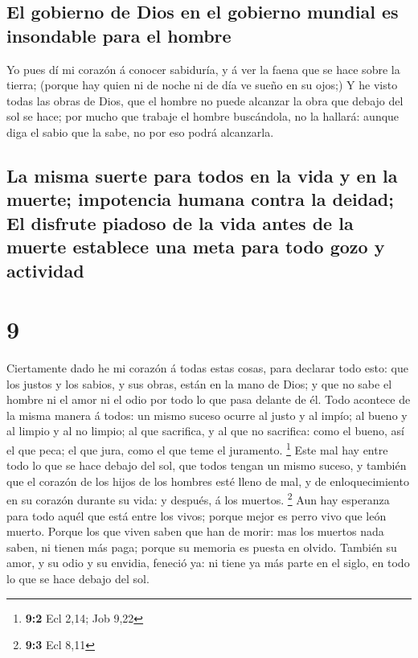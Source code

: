 \hypertarget{el-gobierno-de-dios-en-el-gobierno-mundial-es-insondable-para-el-hombre}{%
\subsection{El gobierno de Dios en el gobierno mundial es insondable
para el
hombre}\label{el-gobierno-de-dios-en-el-gobierno-mundial-es-insondable-para-el-hombre}}

 Yo pues dí mi corazón á conocer sabiduría, y á ver la
faena que se hace sobre la tierra; (porque hay quien ni de noche ni de
día ve sueño en su ojos;)  Y he visto todas las obras de
Dios, que el hombre no puede alcanzar la obra que debajo del sol se
hace; por mucho que trabaje el hombre buscándola, no la hallará: aunque
diga el sabio que la sabe, no por eso podrá alcanzarla.

\hypertarget{la-misma-suerte-para-todos-en-la-vida-y-en-la-muerte-impotencia-humana-contra-la-deidad-el-disfrute-piadoso-de-la-vida-antes-de-la-muerte-establece-una-meta-para-todo-gozo-y-actividad}{%
\subsection{La misma suerte para todos en la vida y en la muerte;
impotencia humana contra la deidad; El disfrute piadoso de la vida antes
de la muerte establece una meta para todo gozo y
actividad}\label{la-misma-suerte-para-todos-en-la-vida-y-en-la-muerte-impotencia-humana-contra-la-deidad-el-disfrute-piadoso-de-la-vida-antes-de-la-muerte-establece-una-meta-para-todo-gozo-y-actividad}}

\hypertarget{section-8}{%
\section{9}\label{section-8}}

 Ciertamente dado he mi corazón á todas estas cosas, para
declarar todo esto: que los justos y los sabios, y sus obras, están en
la mano de Dios; y que no sabe el hombre ni el amor ni el odio por todo
lo que pasa delante de él.  Todo acontece de la misma
manera á todos: un mismo suceso ocurre al justo y al impío; al bueno y
al limpio y al no limpio; al que sacrifica, y al que no sacrifica: como
el bueno, así el que peca; el que jura, como el que teme el juramento.
\footnote{\textbf{9:2} Ecl 2,14; Job 9,22}  Este mal hay
entre todo lo que se hace debajo del sol, que todos tengan un mismo
suceso, y también que el corazón de los hijos de los hombres esté lleno
de mal, y de enloquecimiento en su corazón durante su vida: y después, á
los muertos. \footnote{\textbf{9:3} Ecl 8,11}  Aun hay
esperanza para todo aquél que está entre los vivos; porque mejor es
perro vivo que león muerto.  Porque los que viven saben
que han de morir: mas los muertos nada saben, ni tienen más paga; porque
su memoria es puesta en olvido.  También su amor, y su
odio y su envidia, feneció ya: ni tiene ya más parte en el siglo, en
todo lo que se hace debajo del sol.

